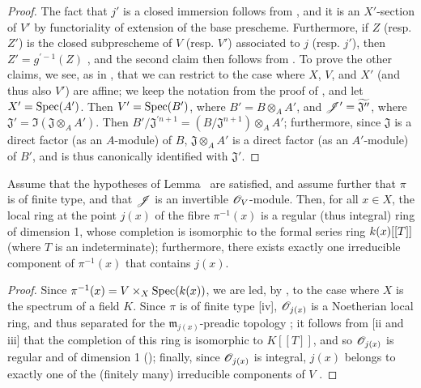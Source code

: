 \begin{proof}
\label{proof-II.8.10.2}
The fact that $j'$ is a closed immersion follows from , and it is an $X'$-section of $V'$ by functoriality of extension of the base prescheme.
Furthermore, if $Z$ (resp. $Z'$) is the closed subprescheme of $V$ (resp. $V'$) associated to $j$ (resp. $j'$), then $Z'=g^{'-1}(Z)$ , and the second claim then follows from .
To prove the other claims, we see, as in , that we can restrict to the case where $X$, $V$, and $X'$ (and thus also $V'$) are affine;
we keep the notation from the proof of , and let $X'=\operatorname{Spec}(A')$.
Then $V'=\operatorname{Spec}(B')$, where $B'=B\otimes_A A'$, and $\mathscr{J}'=\widetilde{\mathfrak{J}''}$, where $\mathfrak{J}'=\Im(\mathfrak{J}\otimes_A A')$.
Then $B'/\mathfrak{J}^{'n+1}=(B/\mathfrak{J}^{n+1})\otimes_A A'$;
furthermore, since $\mathfrak{J}$ is a direct factor (as an $A$-module) of $B$, $\mathfrak{J}\otimes_A A'$ is a direct factor (as an $A'$-module) of $B'$, and is thus canonically identified with $\mathfrak{J}'$.
\end{proof}

\begin{corollary}[8.10.3]
\label{II.8.10.3}
Assume that the hypotheses of Lemma~ are satisfied, and assume further that $\pi$ is of finite type, and that $\mathscr{J}$ is an invertible $\mathscr{O}_V$-module.
Then, for all $x\in X$, the local ring at the point $j(x)$ of the fibre $\pi^{-1}(x)$ is a regular (thus integral) ring of dimension 1, whose completion is isomorphic to the formal series ring $k(x)[[T]]$ (where $T$ is an indeterminate);
furthermore, there exists exactly one irreducible component of $\pi^{-1}(x)$ that contains $j(x)$.
\end{corollary}

\begin{proof}
\label{proof-II.8.10.3}
Since $\pi^{-1}(x)=V\times_X\operatorname{Spec}(k(x))$, we are led, by , to the case where $X$ is the spectrum of a field $K$.
Since $\pi$ is of finite type [iv], $\mathscr{O}_{j(x)}$ is a Noetherian local ring, and thus separated for the $\mathfrak{m}_{j(x)}$-preadic topology ;
it follows from [ii and iii] that the completion of this ring is isomorphic to $K[[T]]$, and so $\mathscr{O}_{j(x)}$ is regular and of dimension 1 (\cite[p.~17-01, th.~1]{I-1});
finally, since $\mathscr{O}_{j(x)}$ is integral, $j(x)$ belongs to exactly one of the (finitely many) irreducible components of $V$ .
\end{proof}

